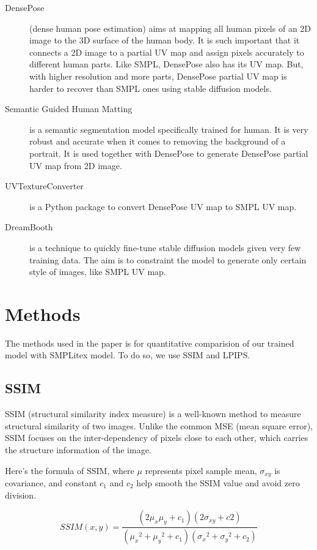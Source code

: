\documentclass[acmtog]{acmart}
\begin{document}
\begin{description}
  \item[DensePose] (dense human pose estimation) \cite{guler2018densepose} aims at mapping all human pixels of an 2D image to the 3D surface of the human body. It is such important that it connects a 2D image to a partial UV map and assign pixels accurately to different human parts. Like SMPL, DensePose also has its UV map. But, with higher resolution and more parts, DensePose partial UV map is harder to recover than SMPL ones using stable diffusion models.
  \item[Semantic Guided Human Matting] \cite{chen2022robust} is a semantic segmentation model specifically trained for human. It is very robust and accurate when it comes to removing the background of a portrait. It is used together with DensePose to generate DensePose partial UV map from 2D image.
  \item[UVTextureConverter] is a Python package to convert DensePose UV map to SMPL UV map.
  \item[DreamBooth] \cite{ruiz2023dreambooth} is a technique to quickly fine-tune stable diffusion models given very few training data. The aim is to constraint the model to generate only certain style of images, like SMPL UV map.
\end{description}

\section{Methods}

The methods used in the paper is for quantitative comparision of our trained model with SMPLitex model. To do so, we use SSIM and LPIPS.

\subsection{SSIM}
SSIM (structural similarity index measure) is a well-known method to measure structural similarity of two images. Unlike the common MSE (mean square error), SSIM focuses on the inter-dependency of pixels close to each other, which carries the structure information of the image.

Here's the formula of SSIM, where \(\mu\) represents pixel sample mean, \(\sigma_{xy}\) is covariance, and constant \(c_1\) and \(c_2\) help smooth the SSIM value and avoid zero division.

\[
  SSIM(x,y)=\frac{(2\mu_x\mu_y+c_1)(2\sigma_{xy}+c2)}{({\mu_x}^2+{\mu_y}^2+c_1)({\sigma_x}^2+{\sigma_y}^2+c_2)}
\]
\end{document}

